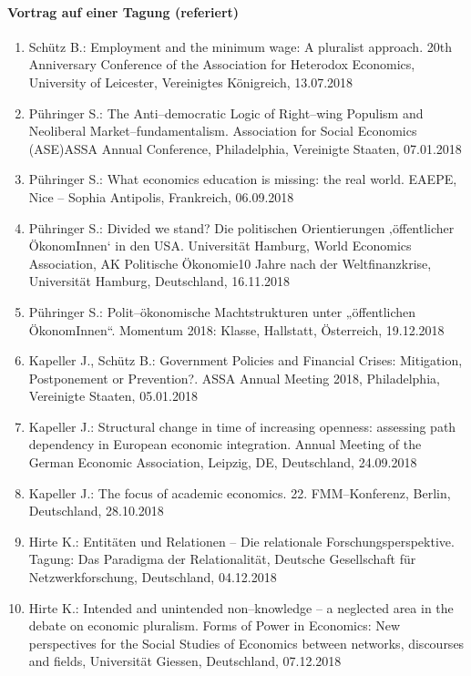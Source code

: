 \paragraph{Vortrag auf einer Tagung (referiert)}
\begin{enumerate}
	\item Schütz B.: Employment and the minimum wage: A pluralist approach. 20th Anniversary Conference of the Association for Heterodox Economics, University of Leicester, Vereinigtes Königreich, 13.07.2018
	\item Pühringer S.: The Anti--democratic Logic of Right--wing Populism and Neoliberal Market--fundamentalism. Association for Social Economics (ASE)ASSA Annual Conference, Philadelphia, Vereinigte Staaten, 07.01.2018
	\item Pühringer S.: What economics education is missing: the real world. EAEPE, Nice -- Sophia Antipolis, Frankreich, 06.09.2018
	\item Pühringer S.: Divided we stand? Die politischen Orientierungen ‚öffentlicher ÖkonomInnen‘ in den USA. Universität Hamburg, World Economics Association, AK Politische Ökonomie10 Jahre nach der Weltfinanzkrise, Universität Hamburg, Deutschland, 16.11.2018
	\item Pühringer S.: Polit--ökonomische Machtstrukturen unter „öffentlichen ÖkonomInnen“. Momentum 2018: Klasse, Hallstatt, Österreich, 19.12.2018
	\item Kapeller J., Schütz B.: Government Policies and Financial Crises: Mitigation, Postponement or Prevention?. ASSA Annual Meeting 2018, Philadelphia, Vereinigte Staaten, 05.01.2018
	\item Kapeller J.: Structural change in time of increasing openness: assessing path dependency in European economic integration. Annual Meeting of the German Economic Association, Leipzig, DE, Deutschland, 24.09.2018
	\item Kapeller J.: The focus of academic economics. 22. FMM--Konferenz, Berlin, Deutschland, 28.10.2018
	\item Hirte K.: Entitäten und Relationen – Die relationale Forschungsperspektive. Tagung: Das Paradigma der Relationalität, Deutsche Gesellschaft für Netzwerkforschung, Deutschland, 04.12.2018
	\item Hirte K.: Intended and unintended non--knowledge – a neglected area in the debate on economic pluralism. Forms of Power in Economics: New perspectives for the Social Studies of Economics between networks, discourses and fields, Universität Giessen, Deutschland, 07.12.2018

\end{enumerate}

